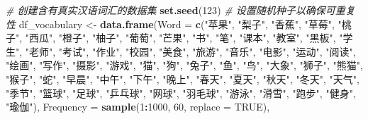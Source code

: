\documentclass[]{book}
\newenvironment{Shaded}{\begin{snugshade}}{\end{snugshade}}
\newcommand{\CommentTok}[1]{\textcolor[rgb]{0.56,0.35,0.01}{\textit{#1}}}
\newcommand{\DataTypeTok}[1]{\textcolor[rgb]{0.13,0.29,0.53}{#1}}
\newcommand{\DecValTok}[1]{\textcolor[rgb]{0.00,0.00,0.81}{#1}}
\newcommand{\KeywordTok}[1]{\textcolor[rgb]{0.13,0.29,0.53}{\textbf{#1}}}
\newcommand{\NormalTok}[1]{#1}
\newcommand{\OperatorTok}[1]{\textcolor[rgb]{0.81,0.36,0.00}{\textbf{#1}}}
\newcommand{\OtherTok}[1]{\textcolor[rgb]{0.56,0.35,0.01}{#1}}
\newcommand{\StringTok}[1]{\textcolor[rgb]{0.31,0.60,0.02}{#1}}
\begin{document}
\begin{Shaded}
\begin{Highlighting}[]
\CommentTok{# 创建含有真实汉语词汇的数据集}
\KeywordTok{set.seed}\NormalTok{(}\DecValTok{123}\NormalTok{)  }\CommentTok{# 设置随机种子以确保可重复性}
\NormalTok{df_vocabulary <-}\StringTok{ }\KeywordTok{data.frame}\NormalTok{(}\DataTypeTok{Word =} \KeywordTok{c}\NormalTok{(}\StringTok{"苹果"}\NormalTok{, }\StringTok{"梨子"}\NormalTok{, }\StringTok{"香蕉"}\NormalTok{, }\StringTok{"草莓"}\NormalTok{, }\StringTok{"桃子"}\NormalTok{, }\StringTok{"西瓜"}\NormalTok{, }\StringTok{"橙子"}\NormalTok{, }\StringTok{"柚子"}\NormalTok{, }\StringTok{"葡萄"}\NormalTok{, }\StringTok{"芒果"}\NormalTok{,}
                                 \StringTok{"书"}\NormalTok{, }\StringTok{"笔"}\NormalTok{, }\StringTok{"课本"}\NormalTok{, }\StringTok{"教室"}\NormalTok{, }\StringTok{"黑板"}\NormalTok{, }\StringTok{"学生"}\NormalTok{, }\StringTok{"老师"}\NormalTok{, }\StringTok{"考试"}\NormalTok{, }\StringTok{"作业"}\NormalTok{, }\StringTok{"校园"}\NormalTok{,}
                                 \StringTok{"美食"}\NormalTok{, }\StringTok{"旅游"}\NormalTok{, }\StringTok{"音乐"}\NormalTok{, }\StringTok{"电影"}\NormalTok{, }\StringTok{"运动"}\NormalTok{, }\StringTok{"阅读"}\NormalTok{, }\StringTok{"绘画"}\NormalTok{, }\StringTok{"写作"}\NormalTok{, }\StringTok{"摄影"}\NormalTok{, }\StringTok{"游戏"}\NormalTok{,}
                                 \StringTok{"猫"}\NormalTok{, }\StringTok{"狗"}\NormalTok{, }\StringTok{"兔子"}\NormalTok{, }\StringTok{"鱼"}\NormalTok{, }\StringTok{"鸟"}\NormalTok{, }\StringTok{"大象"}\NormalTok{, }\StringTok{"狮子"}\NormalTok{, }\StringTok{"熊猫"}\NormalTok{, }\StringTok{"猴子"}\NormalTok{, }\StringTok{"蛇"}\NormalTok{,}
                                 \StringTok{"早晨"}\NormalTok{, }\StringTok{"中午"}\NormalTok{, }\StringTok{"下午"}\NormalTok{, }\StringTok{"晚上"}\NormalTok{, }\StringTok{"春天"}\NormalTok{, }\StringTok{"夏天"}\NormalTok{, }\StringTok{"秋天"}\NormalTok{, }\StringTok{"冬天"}\NormalTok{, }\StringTok{"天气"}\NormalTok{, }\StringTok{"季节"}\NormalTok{,}
                                 \StringTok{"篮球"}\NormalTok{, }\StringTok{"足球"}\NormalTok{, }\StringTok{"乒乓球"}\NormalTok{, }\StringTok{"网球"}\NormalTok{, }\StringTok{"羽毛球"}\NormalTok{, }\StringTok{"游泳"}\NormalTok{, }\StringTok{"滑雪"}\NormalTok{, }\StringTok{"跑步"}\NormalTok{, }\StringTok{"健身"}\NormalTok{, }\StringTok{"瑜伽"}\NormalTok{),}
                        \DataTypeTok{Frequency =} \KeywordTok{sample}\NormalTok{(}\DecValTok{1}\OperatorTok{:}\DecValTok{1000}\NormalTok{, }\DecValTok{60}\NormalTok{, }\DataTypeTok{replace =} \OtherTok{TRUE}\NormalTok{),}

\end{Highlighting}
\end{Shaded}
\end{document}
